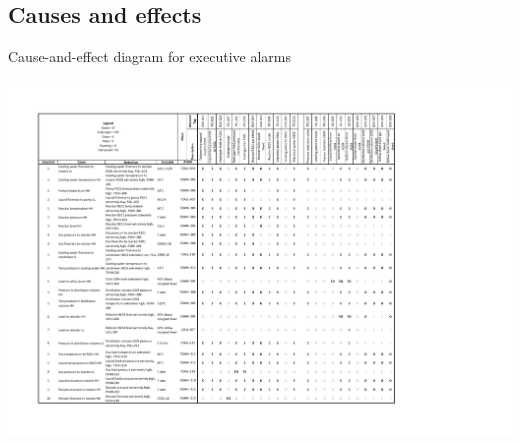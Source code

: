 \begin{landscape}

\section{Causes and effects}
\begin{table}[h]
\label{tab:causeandeffects}
  \caption{Cause-and-effect diagram for executive alarms}
\includegraphics[clip, trim=1cm 0cm 5cm 2cm, width=\linewidth]{chapters/4-operation-control/4-Figures/Cause-and-effects.pdf}
\end{table}

\end{landscape}

%